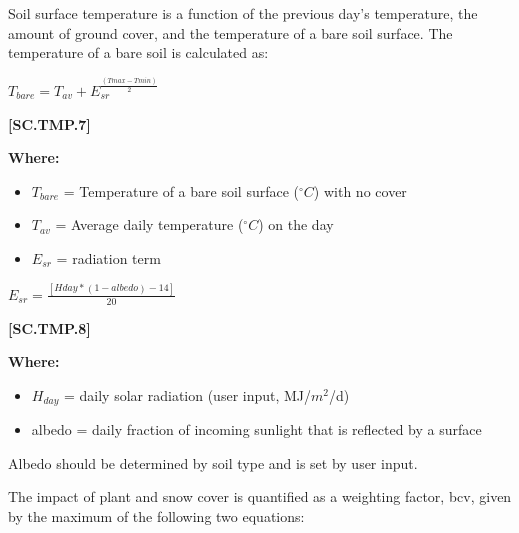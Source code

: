Soil surface temperature is a function of the previous day’s temperature, the amount of ground cover, and the temperature of a bare soil surface. The temperature of a bare soil is calculated as: 
            \vspace{0.5cm}

    \begin{center}
\(T_{bare}=T_{av}+E_{sr}^{\frac{(Tmax-Tmin)}{2}}\)
    \end{center}
        \vspace{0.5cm} 
    
            {\raggedleft \textbf{[SC.TMP.7]}\par}
            \vspace{0.5cm}

        \textbf{Where:}
        
        \begin{itemize}
            \item \(T_{bare}\)	=	Temperature of a bare soil surface (\(^\circ C\)) with no cover
            \item \(T_{av}\)	=	Average daily temperature (\(^\circ C\)) on the day
            \item \(E_{sr}\) =	radiation term
        \end{itemize}
            \vspace{0.5cm}

    \begin{center}
\(E_{sr}=\frac{[Hday * (1-albedo)-14]}{20}\)
    \end{center}
        \vspace{0.5cm} 
    
            {\raggedleft \textbf{[SC.TMP.8]}\par}
            \vspace{0.5cm}

        \textbf{Where:}
        
        \begin{itemize}
            \item \(H_{day}\)	=	daily solar radiation (user input, MJ/\(m^2\)/d)
            \item albedo	=	daily fraction of incoming sunlight that is reflected by a surface
        \end{itemize}

Albedo should be determined by soil type and is set by user input. 
		
The impact of plant and snow cover is quantified as a weighting factor, bcv, given by the maximum of the following two equations:
            \vspace{0.5cm}

